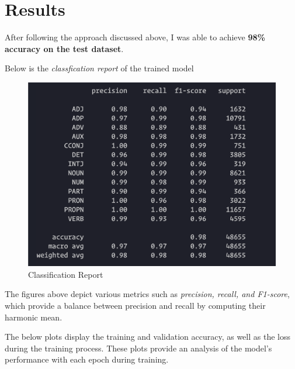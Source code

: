 \section{Results}

After following the approach discussed above, I was able to achieve \textbf{98\% accuracy on the test dataset}.

Below is the \textit{classfication report} of the trained model

\begin{figure}[h]
	\centering
	\includegraphics[scale=0.8]{img/class_report.png}
	\caption{Classification Report}
\end{figure}

The figures above depict various metrics such as \textit{precision, recall, and F1-score}, which provide a balance between precision and recall by computing their harmonic mean.


The below plots display the training and validation accuracy, as well as the loss during the training process. These plots provide an analysis of the model's performance with each epoch during training.



